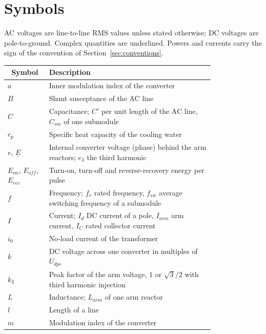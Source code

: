 \section{Symbols}
\label{sec:symbols}

AC voltages are line-to-line RMS values unless stated otherwise; DC voltages are pole-to-ground. Complex quantities
are underlined. Powers and currents carry the sign of the convention of Section~\ref{sec:conventions}.

\begin{longtable}{@{}l p{0.80\linewidth}@{}}
  \toprule
  \multicolumn{1}{c}{\textbf{Symbol}} & \textbf{Description} \\
  \midrule
  \endhead
  $a$        & Inner modulation index of the converter \\
  $B$        & Shunt susceptance of the AC line \\
  $C$        & Capacitance; $C'$ per unit length of the AC line, $C_{sm}$ of one submodule \\
  $c_p$      & Specific heat capacity of the cooling water \\
  $e$, $\underline{E}$ & Internal converter voltage (phase) behind the arm reactors; $e_3$ the third harmonic \\
  $E_{on}$, $E_{off}$, $E_{rec}$ & Turn-on, turn-off and reverse-recovery energy per pulse \\
  $f$        & Frequency; $f_r$ rated frequency, $f_{sw}$ average switching frequency of a submodule \\
  $I$        & Current; $I_d$ DC current of a pole, $I_{arm}$ arm current, $I_C$ rated collector current \\
  $i_0$      & No-load current of the transformer \\
  $k$        & DC voltage across one converter in multiples of $U_{dpe}$ \\
  $k_3$      & Peak factor of the arm voltage, 1 or $\sqrt{3}/2$ with third harmonic injection \\
  $L$        & Inductance; $L_{arm}$ of one arm reactor \\
  $l$        & Length of a line \\
  $m$        & Modulation index of the converter \\

\end{longtable}
